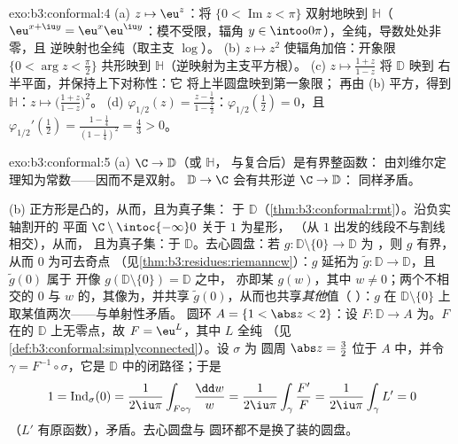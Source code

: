 \begin{solution}{exo:b3:conformal:4}
(a) $z \mapsto \eu^z$：将 $\{0 < \operatorname{Im}z <
\pi\}$ 双射地映到 $\mathbb H$（$\eu^{x+\iu y} =
\eu^x\eu^{\iu y}$：模不受限，辐角 $y \in
\intoo0\pi$），全纯，导数处处非零，且
逆映射也全纯（取主支 $\log$）。
(b) $z \mapsto z^2$ 使辐角加倍：开象限
$\{0 < \arg z < \frac\pi2\}$ 共形映到 $\mathbb
H$（逆映射为主支平方根）。
(c) $z \mapsto \frac{1 + z}{1 - z}$ 将 $\mathbb D$ 映到
右半平面，并保持上下对称性：它
将上半圆盘映到第一象限；
再由 (b) 平方，得到 $\mathbb H$：$z \mapsto \bigl(\frac{1
+ z}{1 - z}\bigr)^2$。
(d)  $\varphi_{1/2}(z) = \frac{z -
\frac12}{1 - \frac z2}$：$\varphi_{1/2}(\tfrac12) = 0$，且
$\varphi_{1/2}'(\tfrac12) = \frac{1 - \frac14}{(1 -
\frac14)^2} = \frac43 > 0$。
\end{solution}

\begin{solution}{exo:b3:conformal:5}
(a)  $\C \to \mathbb D$（或 $\mathbb H$，
与复合后）是有界整函数：
由刘维尔定理知为常数——因而不是双射。 $\mathbb
D \to \C$ 会有共形逆 $\C \to \mathbb D$：
同样矛盾。

(b) 正方形是凸的，从而，且为真子集：
于 $\mathbb D$（\cref{thm:b3:conformal:rmt}）。沿负实轴割开的
平面 $\C\setminus\intoc{-\infty}0$ 关于 $1$ 为星形，
（从 $1$ 出发的线段不与割线相交），从而，
且为真子集：于 $\mathbb D$。去心圆盘：若
$g \colon \mathbb D\setminus\{0\} \to \mathbb D$ 为
，则 $g$ 有界，从而 $0$ 为可去奇点
（见\cref{thm:b3:residues:riemanncw}）：$g$ 延拓为 $\tilde g
\colon \mathbb D \to \mathbb D$，且 $\tilde g(0)$ 属于
开像 $g(\mathbb D\setminus\{0\}) = \mathbb D$ 之中，
亦即某 $g(w)$，其中 $w \neq 0$；两个不相交的
$0$ 与 $w$ 的，其像为，并共享
$\tilde g(0)$，从而也共享\emph{其他}值（
）：$g$ 在
$\mathbb D\setminus\{0\}$ 上取某值两次——与单射性矛盾。
圆环 $A = \{1 < \abs z < 2\}$：设 $F \colon \mathbb D
\to A$ 为。$F$ 在的
$\mathbb D$ 上无零点，故 $F = \eu^L$，其中 $L$ 全纯
（见\cref{def:b3:conformal:simplyconnected}）。设 $\sigma$ 为
圆周 $\abs z = \frac32$ 位于 $A$ 中，并令 $\gamma =
F^{-1}\circ\sigma$，它是 $\mathbb D$ 中的闭路径；于是
\[
1 = \operatorname{Ind}_\sigma(0)
= \frac1{2\iu\pi}\int_{F\circ\gamma}\frac{\dd w}{w}
= \frac1{2\iu\pi}\int_\gamma\frac{F'}{F}
= \frac1{2\iu\pi}\int_\gamma L' = 0
\]
（$L'$ 有原函数），矛盾。去心圆盘与
圆环都不是换了装的圆盘。
\end{solution}

